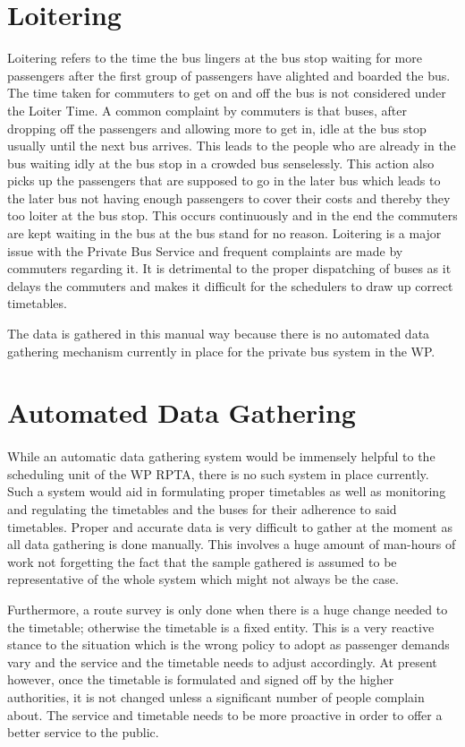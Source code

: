 \documentclass[12pt, oneside]{report}
\begin{document}
\section{Loitering} Loitering refers to the time the bus lingers at the bus stop waiting for more passengers after the first group of passengers have alighted and boarded the bus. The time taken for commuters to get on and off the bus is not considered under the Loiter Time. A common complaint by commuters is that buses, after dropping off the passengers and allowing more to get in, idle at the bus stop usually until the next bus arrives. This leads to the people who are already in the bus waiting idly at the bus stop in a crowded bus senselessly. This action also picks up the passengers that are supposed to go in the later bus which leads to the later bus not having enough passengers to cover their costs and thereby they too loiter at the bus stop. This occurs continuously and in the end the commuters are kept waiting in the bus at the bus stand for no reason. Loitering is a major issue with the Private Bus Service and frequent complaints are made by commuters regarding it. It is detrimental to the proper dispatching of buses as it delays the commuters and makes it difficult for the schedulers to draw up correct timetables.

The data is gathered in this manual way because there is no automated data gathering mechanism currently in place for the private bus system in the WP.

\section{Automated Data Gathering}

\paragraph{ } While an automatic data gathering system would be immensely helpful to the scheduling unit of the WP RPTA, there is no such system in place currently. Such a system would aid in formulating proper timetables as well as monitoring and regulating the timetables and the buses for their adherence to said timetables. Proper and accurate data is very difficult to gather at the moment as all data gathering is done manually. This involves a huge amount of man-hours of work not forgetting the fact that the sample gathered is assumed to be representative of the whole system which might not always be the case. 

Furthermore, a route survey is only done when there is a huge change needed to the timetable; otherwise the timetable is a fixed entity. This is a very reactive stance to the situation which is the wrong policy to adopt as passenger demands vary and the service and the timetable needs to adjust accordingly. At present however, once the timetable is formulated and signed off by the higher authorities, it is not changed unless a significant number of people complain about. The service and timetable needs to be more proactive in order to offer a better service to the public.
\end{document}
